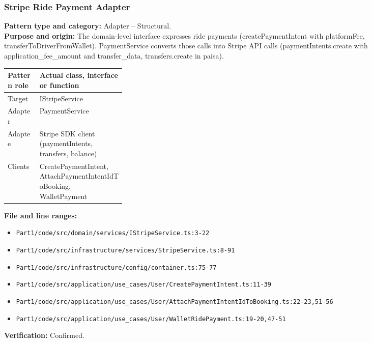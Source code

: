 \documentclass[11pt,a4paper]{article}
\begin{document}
\subsubsection*{Stripe Ride Payment Adapter}
\textbf{Pattern type and category:} Adapter -- Structural.\\
\textbf{Purpose and origin:} The domain-level interface expresses ride payments (createPaymentIntent with platformFee, transferToDriverFromWallet). PaymentService converts those calls into Stripe API calls (paymentIntents.create with application\_fee\_amount and transfer\_data, transfers.create in paisa).

\noindent\begin{tabularx}{\linewidth}{@{}P{0.27\linewidth}Y@{}}
\toprule Pattern role & Actual class, interface or function \\ \midrule
Target & IStripeService \\
Adapter & PaymentService \\
Adaptee & Stripe SDK client (paymentIntents, transfers, balance) \\
Clients & CreatePaymentIntent, AttachPaymentIntentIdToBooking, WalletPayment \\
\bottomrule
\end{tabularx}

\noindent\textbf{File and line ranges:}\begin{itemize}\setlength\itemsep{0pt}\item \texttt{Part1/\allowbreak{}code/\allowbreak{}src/\allowbreak{}domain/\allowbreak{}services/\allowbreak{}IStripeService.\allowbreak{}ts:3-22}\item \texttt{Part1/\allowbreak{}code/\allowbreak{}src/\allowbreak{}infrastructure/\allowbreak{}services/\allowbreak{}StripeService.\allowbreak{}ts:8-91}\item \texttt{Part1/\allowbreak{}code/\allowbreak{}src/\allowbreak{}infrastructure/\allowbreak{}config/\allowbreak{}container.\allowbreak{}ts:75-77}\item \texttt{Part1/\allowbreak{}code/\allowbreak{}src/\allowbreak{}application/\allowbreak{}use\_\allowbreak{}cases/\allowbreak{}User/\allowbreak{}CreatePaymentIntent.\allowbreak{}ts:11-39}\item \texttt{Part1/\allowbreak{}code/\allowbreak{}src/\allowbreak{}application/\allowbreak{}use\_\allowbreak{}cases/\allowbreak{}User/\allowbreak{}AttachPaymentIntentIdToBooking.\allowbreak{}ts:22-23,51-56}\item \texttt{Part1/\allowbreak{}code/\allowbreak{}src/\allowbreak{}application/\allowbreak{}use\_\allowbreak{}cases/\allowbreak{}User/\allowbreak{}WalletRidePayment.\allowbreak{}ts:19-20,47-51}\end{itemize}
\noindent\textbf{Verification:} Confirmed.
\end{document}
